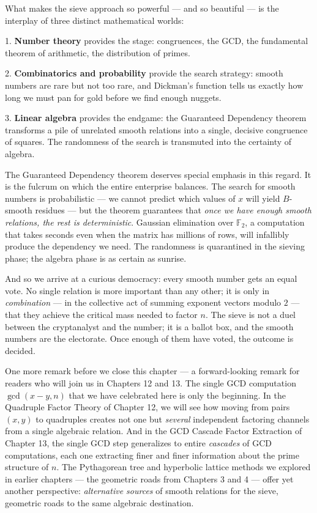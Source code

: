 What makes the sieve approach so powerful --- and so beautiful --- is the interplay of three distinct mathematical worlds:

1. \textbf{Number theory} provides the stage: congruences, the GCD, the fundamental theorem of arithmetic, the distribution of primes.

2. \textbf{Combinatorics and probability} provide the search strategy: smooth numbers are rare but not too rare, and Dickman's function tells us exactly how long we must pan for gold before we find enough nuggets.

3. \textbf{Linear algebra} provides the endgame: the Guaranteed Dependency theorem transforms a pile of unrelated smooth relations into a single, decisive congruence of squares. The randomness of the search is transmuted into the certainty of algebra.

The Guaranteed Dependency theorem deserves special emphasis in this regard. It is the fulcrum on which the entire enterprise balances. The search for smooth numbers is probabilistic --- we cannot predict which values of $x$ will yield $B$-smooth residues --- but the theorem guarantees that \textit{once we have enough smooth relations, the rest is deterministic}. Gaussian elimination over $\mathbb{F}_2$, a computation that takes seconds even when the matrix has millions of rows, will infallibly produce the dependency we need. The randomness is quarantined in the sieving phase; the algebra phase is as certain as sunrise.

And so we arrive at a curious democracy: every smooth number gets an equal vote. No single relation is more important than any other; it is only in \textit{combination} --- in the collective act of summing exponent vectors modulo $2$ --- that they achieve the critical mass needed to factor $n$. The sieve is not a duel between the cryptanalyst and the number; it is a ballot box, and the smooth numbers are the electorate. Once enough of them have voted, the outcome is decided.


One more remark before we close this chapter --- a forward-looking remark for readers who will join us in Chapters 12 and 13. The single GCD computation $\gcd(x - y, n)$ that we have celebrated here is only the beginning. In the Quadruple Factor Theory of Chapter 12, we will see how moving from pairs $(x, y)$ to quadruples creates not one but \textit{several} independent factoring channels from a single algebraic relation. And in the GCD Cascade Factor Extraction of Chapter 13, the single GCD step generalizes to entire \textit{cascades} of GCD computations, each one extracting finer and finer information about the prime structure of $n$. The Pythagorean tree and hyperbolic lattice methods we explored in earlier chapters --- the geometric roads from Chapters 3 and 4 --- offer yet another perspective: \textit{alternative sources} of smooth relations for the sieve, geometric roads to the same algebraic destination.

